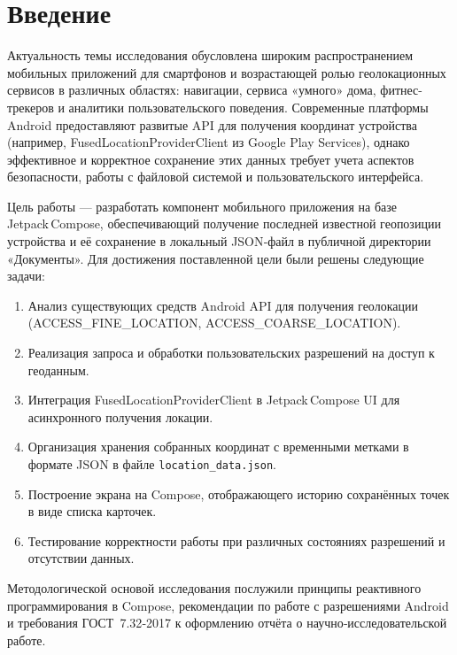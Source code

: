\chapter*{Введение}

Актуальность темы исследования обусловлена широким распространением мобильных приложений для смартфонов и возрастающей ролью геолокационных сервисов в различных областях: навигации, сервиса «умного» дома, фитнес-трекеров и аналитики пользовательского поведения. Современные платформы Android предоставляют развитые API для получения координат устройства \cite{android_location,fused_location_api}(например, FusedLocationProviderClient из Google Play Services), однако эффективное и корректное сохранение этих данных требует учета аспектов безопасности, работы с файловой системой и пользовательского интерфейса.

Цель работы — разработать компонент мобильного приложения на базе Jetpack Compose, обеспечивающий получение последней известной геопозиции устройства и её сохранение в локальный JSON‑файл в публичной директории «Документы». Для достижения поставленной цели были решены следующие задачи:
\begin{enumerate}
    \item Анализ существующих средств Android API для получения геолокации (ACCESS\_FINE\_LOCATION, ACCESS\_COARSE\_LOCATION).
    \item Реализация запроса и обработки пользовательских разрешений на доступ к геоданным.
    \item Интеграция FusedLocationProviderClient в Jetpack Compose UI для асинхронного получения локации.
    \item Организация хранения собранных координат с временными метками в формате JSON в файле \texttt{location\_data.json}.
    \item Построение экрана на Compose, отображающего историю сохранённых точек в виде списка карточек.
    \item Тестирование корректности работы при различных состояниях разрешений и отсутствии данных.
\end{enumerate}

Методологической основой исследования послужили принципы реактивного программирования в Compose, рекомендации по работе с разрешениями Android и требования ГОСТ 7.32‑2017\cite{gost7322017} к оформлению отчёта о научно‑исследовательской работе.
